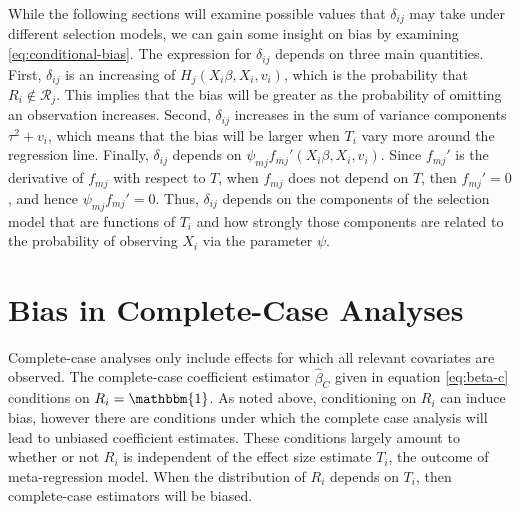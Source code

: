 \documentclass[
]{article}
\begin{document}
While the following sections will examine possible values that \(\delta_{ij}\) may take under different selection models, we can gain some insight on bias by examining \eqref{eq:conditional-bias}.
The expression for \(\delta_{ij}\) depends on three main quantities.
First, \(\delta_{ij}\) is an increasing of \(H_j(X_i\beta, X_i, v_i)\), which is the probability that \(R_i \not\in \mathcal{R}_j\).
This implies that the bias will be greater as the probability of omitting an observation increases.
Second, \(\delta_{ij}\) increases in the sum of variance components \(\tau^2 + v_i\), which means that the bias will be larger when \(T_i\) vary more around the regression line.
Finally, \(\delta_{ij}\) depends on \(\psi_{mj} f_{mj}'(X_i\beta, X_i, v_i)\).
Since \(f_{mj}'\) is the derivative of \(f_{mj}\) with respect to \(T\), when \(f_{mj}\) does not depend on \(T\), then \(f_{mj}' = 0\), and hence \(\psi_{mj} f_{mj}' = 0\).
Thus, \(\delta_{ij}\) depends on the components of the selection model that are functions of \(T_i\) and how strongly those components are related to the probability of observing \(X_i\) via the parameter \(\psi\).

\hypertarget{bias-in-complete-case-analyses}{%
\section{Bias in Complete-Case Analyses}\label{bias-in-complete-case-analyses}}

Complete-case analyses only include effects for which all relevant covariates are observed.
The complete-case coefficient estimator \(\hat{\beta}_C\) given in equation \eqref{eq:beta-c} conditions on \(R_i = \mathbbm{1}\).
As noted above, conditioning on \(R_i\) can induce bias, however there are conditions under which the complete case analysis will lead to unbiased coefficient estimates.
These conditions largely amount to whether or not \(R_i\) is independent of the effect size estimate \(T_i\), the outcome of meta-regression model.
When the distribution of \(R_i\) depends on \(T_i\), then complete-case estimators will be biased.
\end{document}

